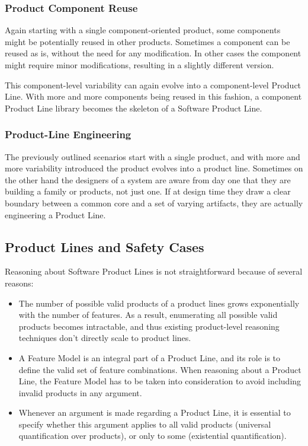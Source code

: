 \documentclass[11pt]{article}
\begin{document}
\subsubsection{Product Component Reuse}

Again starting with a single component-oriented product, some components might be potentially reused in other products. Sometimes a component can be reused as is, without the need for any modification. In other cases the component might require minor modifications, resulting in a slightly different version. 

This component-level variability can again evolve into a component-level Product Line. With more and more components being reused in this fashion, a component Product Line library becomes the skeleton of a Software Product Line.

\subsubsection{Product-Line Engineering}

The previously outlined scenarios start with a single product, and with more and more variability introduced the product evolves into a product line. Sometimes on the other hand the designers of a system are aware from day one that they are building a family or products, not just one. If at design time they draw a clear boundary between a common core and a set of varying artifacts, they are actually engineering a Product Line.

\subsection{Product Lines and Safety Cases}

Reasoning about Software Product Lines is not straightforward because of several reasons:

\begin{itemize}

\item The number of possible valid products of a product lines grows exponentially with the number of features. As a result, enumerating all possible valid products becomes intractable, and thus existing product-level reasoning techniques don't directly scale to product lines.

\item A Feature Model is an integral part of a Product Line, and its role is to define the valid set of feature combinations. When reasoning about a Product Line, the Feature Model has to be taken into consideration to avoid including invalid products in any argument.

\item Whenever an argument is made regarding a Product Line, it is essential to specify whether this argument applies to all valid products (universal quantification over products), or only to some (existential quantification). 

\end{itemize}
\end{document}
